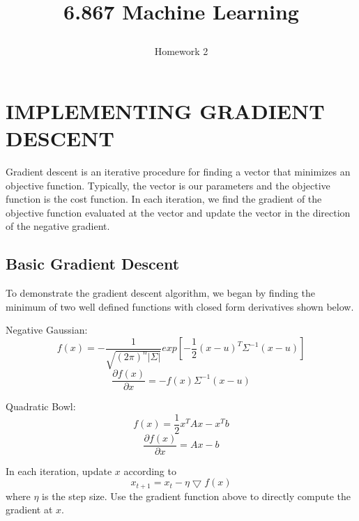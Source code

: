 \documentclass[a4paper,twoside]{article}
\begin{document}
\title{6.867 Machine Learning  \subtitle{Homework 2} }

\maketitle


\section{\uppercase{Implementing Gradient Descent}}

\noindent Gradient descent is an iterative procedure for finding a vector that minimizes an objective function. Typically, the vector is our parameters and the objective function is the cost function. In each iteration, we find the gradient of the objective function evaluated at the vector and update the vector in the direction of the negative gradient.

\subsection{Basic Gradient Descent}

\noindent To demonstrate the gradient descent algorithm, we began by finding the minimum of two well defined functions with closed form derivatives shown below.

\medskip
\noindent Negative Gaussian:
\begin{equation}
f(x) = - \frac{1}{\sqrt{(2\pi)^n |\Sigma|}} exp[-\frac{1}{2} (x-u)^T\Sigma^{-1}(x-u)]
\end{equation}
\begin{equation}
\frac{\partial f(x)}{\partial x} = -f(x) \Sigma^{-1} (x-u)
\end{equation}

\noindent Quadratic Bowl:
\begin{equation}
f(x) = \frac{1}{2} x^T A x - x^T b
\end{equation}
\begin{equation}
\frac{\partial f(x)}{\partial x} = Ax - b
\end{equation}

\noindent In each iteration, update $x$ according to 
\begin{equation}
x_{t+1} = x_{t} - \eta \bigtriangledown f(x)
\end{equation}
where $\eta$ is the step size. Use the gradient function above to directly compute the gradient at $x$.
\end{document}
